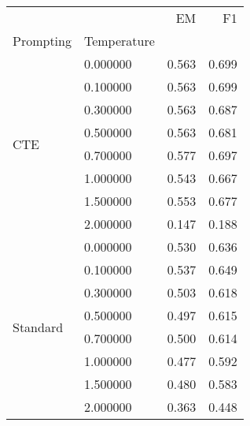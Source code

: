 \begin{tabular}{llrr}
\toprule
 &  & EM & F1 \\
Prompting & Temperature &  &  \\
\midrule
\multirow[t]{8}{*}{CTE} & 0.000000 & 0.563 & 0.699 \\
 & 0.100000 & 0.563 & 0.699 \\
 & 0.300000 & 0.563 & 0.687 \\
 & 0.500000 & 0.563 & 0.681 \\
 & 0.700000 & 0.577 & 0.697 \\
 & 1.000000 & 0.543 & 0.667 \\
 & 1.500000 & 0.553 & 0.677 \\
 & 2.000000 & 0.147 & 0.188 \\
\cline{1-4}
\multirow[t]{8}{*}{Standard} & 0.000000 & 0.530 & 0.636 \\
 & 0.100000 & 0.537 & 0.649 \\
 & 0.300000 & 0.503 & 0.618 \\
 & 0.500000 & 0.497 & 0.615 \\
 & 0.700000 & 0.500 & 0.614 \\
 & 1.000000 & 0.477 & 0.592 \\
 & 1.500000 & 0.480 & 0.583 \\
 & 2.000000 & 0.363 & 0.448 \\
\cline{1-4}
\bottomrule
\end{tabular}

